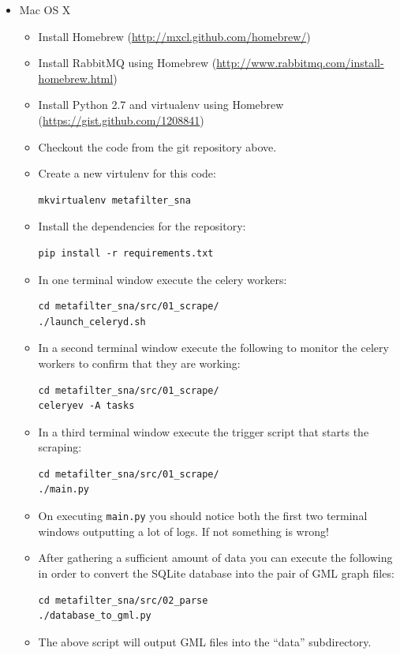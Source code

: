 \begin{itemize}
\item
  Mac OS X

  \begin{itemize}
  \item
    Install Homebrew (\url{http://mxcl.github.com/homebrew/})
  \item
    Install RabbitMQ using Homebrew
    (\url{http://www.rabbitmq.com/install-homebrew.html})
  \item
    Install Python 2.7 and virtualenv using Homebrew
    (\url{https://gist.github.com/1208841})
  \item
    Checkout the code from the git repository above.
  \item
    Create a new virtulenv for this code:

\begin{verbatim}
mkvirtualenv metafilter_sna
\end{verbatim}
  \item
    Install the dependencies for the repository:

\begin{verbatim}
pip install -r requirements.txt
\end{verbatim}
  \item
    In one terminal window execute the celery workers:

\begin{verbatim}
cd metafilter_sna/src/01_scrape/
./launch_celeryd.sh
\end{verbatim}
  \item
    In a second terminal window execute the following to monitor the
    celery workers to confirm that they are working:

\begin{verbatim}
cd metafilter_sna/src/01_scrape/
celeryev -A tasks
\end{verbatim}
  \item
    In a third terminal window execute the trigger script that starts
    the scraping:

\begin{verbatim}
cd metafilter_sna/src/01_scrape/
./main.py
\end{verbatim}
  \item
    On executing \texttt{main.py} you should notice both the first two
    terminal windows outputting a lot of logs. If not something is
    wrong!
  \item
    After gathering a sufficient amount of data you can execute the
    following in order to convert the SQLite database into the pair of
    GML graph files:

\begin{verbatim}
cd metafilter_sna/src/02_parse
./database_to_gml.py
\end{verbatim}
  \item
    The above script will output GML files into the ``data''
    subdirectory.
  \end{itemize}
\end{itemize}

